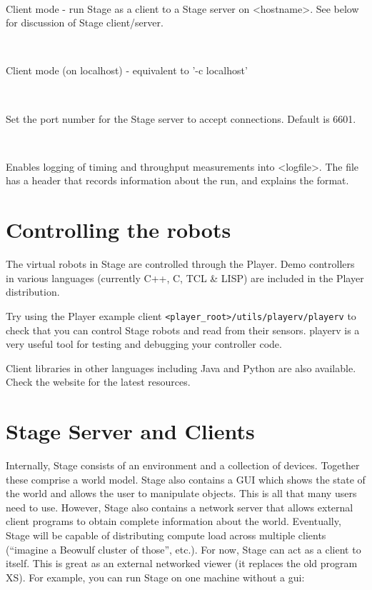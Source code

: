 \documentclass[11pt,twoside]{report}
\newenvironment{xarg}[1]{\noindent{\tt #1}\\\hspace*{2em}\begin{minipage}[t]{5in}}{\end{minipage}\vspace*{1em}}
\begin{document}
    \begin{xarg}{-c <hostname>}Client mode - run Stage as a client to
    a Stage server on <hostname>. See below for discussion of Stage
    client/server.  \end{xarg}

    \begin{xarg}{-cl}Client mode (on localhost) - equivalent to '-c localhost' 
	 \end{xarg}

    \begin{xarg}{-p <port num>}
    Set the port number for the Stage server to accept connections. Default is 6601.
    \end{xarg}

    \begin{xarg}{-l <logfile>} Enables logging of timing and
    throughput measurements into <logfile>. The file has a header that
    records information about the run, and explains the format.
    \end{xarg}

\section{Controlling the robots}

The virtual robots in Stage are controlled through the Player.  Demo
controllers in various languages (currently C++, C, TCL \& LISP) are
included in the Player distribution.

Try using the Player example client
\verb+<player_root>/utils/playerv/playerv+ to check that you can control
Stage robots and read from their sensors. playerv is a very useful
tool for testing and debugging your controller code.

Client libraries in other languages including Java and Python are also
available. Check the website for the latest resources.

\section{Stage Server and Clients}
Internally, Stage consists of an environment and a collection of
devices. Together these comprise a world model. Stage also contains a
GUI which shows the state of the world and allows the user to
manipulate objects. This is all that many users need to use. However,
Stage also contains a network server that allows external client
programs to obtain complete information about the world. Eventually,
Stage will be capable of distributing compute load across multiple
clients (``imagine a Beowulf cluster of those'', etc.). For now, Stage can
act as a client to itself. This is great as an external networked
viewer (it replaces the old program XS). For example, you can run
Stage on one machine without a gui:
\end{document}
